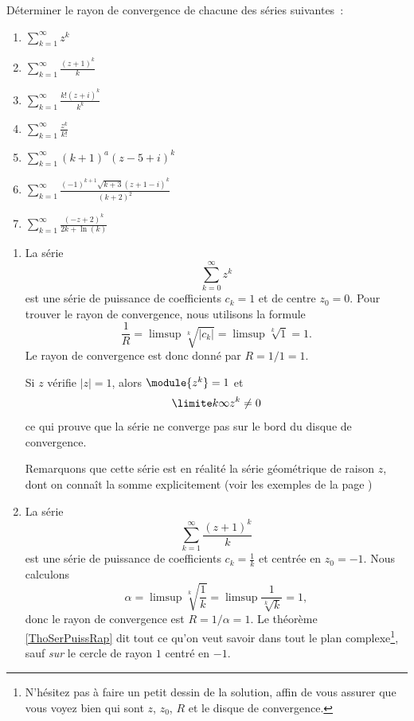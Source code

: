 \documentclass[12pt,french,oneside,a4paper]{memoir} %
\begin{document}
\begin{exo}
Déterminer le rayon de convergence de chacune des séries suivantes~:
\begin{multicols}{2}
\begin{enumerate}
\item $ \sum_{k = 1}^{\infty} z^k $
\item $ \sum_{k = 1}^{\infty} \frac{(z+1)^k}{k} $
\item $ \sum_{k = 1}^{\infty} \frac{k!(z+i)^k}{k^k} $
\item $ \sum_{k = 1}^{\infty} \frac{z^k}{k!} $
\item $ \sum_{k = 1}^{\infty} (k+1)^a (z-5+i)^k $
\item $ \sum_{k = 1}^{\infty} \frac{(-1)^{k+1} \sqrt{k+3} (z+1-i)^k }{(k+2)^2} $
\item $ \sum_{k = 1}^{\infty} \frac{(-z+2)^k}{2k +\ln(k)} $
\end{enumerate}
\end{multicols}

\begin{correction}
\begin{enumerate}
\item La série
\begin{equation*}
	\sum_{k=0}^\infty z^k
\end{equation*}
est une série de puissance de coefficients $c_k = 1$ et de centre $z_0
= 0$. Pour trouver le rayon de convergence, nous utilisons la formule
\begin{equation*}
	\frac1R = \limsup\sqrt[k]{| c_k |}=\limsup\sqrt[k]{1}=1.
\end{equation*}
Le rayon de convergence est donc donné par $R = 1/1 = 1$.

Si $z$ vérifie $| z | = 1$, alors $\module{z^k} = 1$ et
\begin{equation*}
	\limite k \infty z^k \neq 0
\end{equation*}
ce qui prouve que la série ne converge pas sur le bord du disque de
convergence.

Remarquons que cette série est en réalité la série géométrique de
raison $z$, dont on connaît la somme explicitement (voir les exemples
de la page \pageref{exemples:series}) %

\item La série
\begin{equation*}
	\sum_{k=1}^\infty \frac{{(z+1)}^k}{k}
\end{equation*}
est une série de puissance de coefficients $c_k = \frac{1}{ k }$ et centrée en $z_0 = -1$. Nous calculons
\begin{equation}
	\alpha=\limsup\sqrt[k]{\frac{1}{ k }}=\limsup\frac{1}{ \sqrt[k]{k} }=1,
\end{equation}
donc le rayon de convergence est $R = 1/\alpha = 1$. Le théorème
\ref{ThoSerPuissRap} %
dit tout ce qu'on veut savoir dans tout le plan
complexe\footnote{N'hésitez pas à faire un petit dessin de la
  solution, affin de vous assurer que vous voyez bien qui sont $z$,
  $z_0$, $R$ et le disque de convergence.}, sauf \emph{sur} le cercle
de rayon $1$ centré en $-1$.


\end{enumerate}
\end{correction}
\end{exo}
\end{document}
